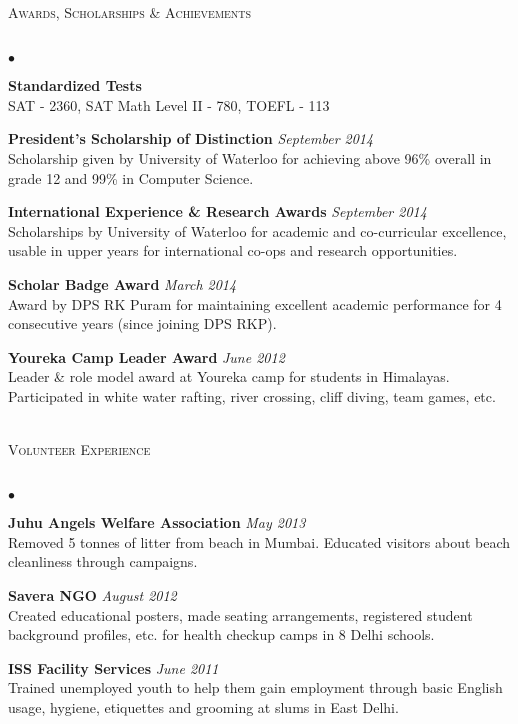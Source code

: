 \documentclass{article}
\newcommand{\lineunder}{\vspace*{-8pt} \\ \hspace*{-18pt} \hrulefill \\}
\newcommand{\header}[1]{{\hspace*{-15pt}\vspace*{6pt} \textsc{#1}} \vspace*{-6pt} \lineunder}
\newenvironment{achievements}{\begin{list}{$\bullet$}{\topsep 0pt \itemsep -1.5pt \leftmargin 5pt}}{\vspace*{4pt}\end{list}}
\begin{document}
\header{\normalsize Awards, Scholarships \& Achievements}
\begin{achievements}
\item \textbf{Standardized Tests} \\ SAT - 2360, SAT Math Level II - 780, TOEFL - 113
\item \textbf{President's Scholarship of Distinction} \hfill \textit {September 2014}
\\ Scholarship given by University of Waterloo for achieving above 96\% overall in grade 12 and 99\% in Computer Science.
\item \textbf{International Experience \& Research Awards} \hfill \textit {September 2014}
\\ Scholarships by University of Waterloo for academic and co-curricular excellence, usable in upper years for international co-ops and research opportunities.
\item \textbf{Scholar Badge Award} \hfill \textit {March 2014}
\\ Award by DPS RK Puram for maintaining excellent academic performance for 4 consecutive years (since joining DPS RKP).
\item \textbf{Youreka Camp Leader Award} \hfill \textit {June 2012}
\\ Leader \& role model award at Youreka camp for students in Himalayas. Participated in white water rafting, river crossing, cliff diving, team games, etc. \\ \hspace*{-18pt}  \\
\end{achievements}

\header{\normalsize Volunteer Experience}
\begin{achievements}
\item \textbf{Juhu Angels Welfare Association}   \hfill \textit{May 2013}
\\ Removed 5 tonnes of litter from beach in Mumbai. Educated visitors about beach cleanliness through campaigns.
\item \textbf{Savera NGO}     \hfill \textit{August 2012}
\\ Created educational posters, made seating arrangements, registered student background profiles, etc. for health checkup camps in 8 Delhi schools.
\item \textbf{ISS Facility Services}    \hfill \textit{June 2011}
\\ Trained unemployed youth to help them gain employment through basic English usage, hygiene, etiquettes and grooming at slums in East Delhi.
\end{achievements}
\end{document}
